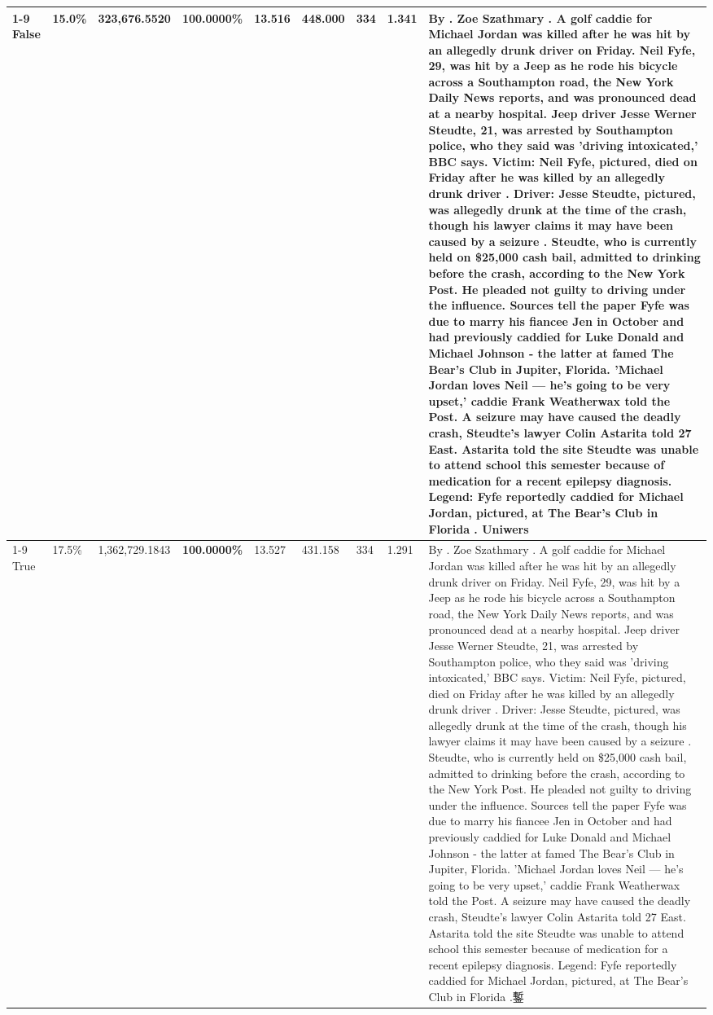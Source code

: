 \begin{table}[H]
\begin{tabular}{lllrlllll}
\cline{1-9}
False & 15.0\% & 323,676.5520 & \bfseries \color{red} 100.0000\% & 13.516 & 448.000 & 334 & 1.341 & By . Zoe Szathmary . A golf caddie for Michael Jordan was killed after he was hit by an allegedly drunk driver on Friday. Neil Fyfe, 29, was hit by a Jeep as he rode his bicycle across a Southampton road, the New York Daily News reports, and was pronounced dead at a nearby hospital. Jeep driver Jesse Werner Steudte, 21, was arrested by Southampton police, who they said was 'driving intoxicated,' BBC says. Victim: Neil Fyfe, pictured, died on Friday after he was killed by an allegedly drunk driver . Driver: Jesse Steudte, pictured, was allegedly drunk at the time of the crash, though his lawyer claims it may have been caused by a seizure . Steudte, who is currently held on \$25,000 cash bail, admitted to drinking before the crash, according to the New York Post. He pleaded not guilty to driving under the influence. Sources tell the paper Fyfe was due to marry his fiancee Jen in October and had previously caddied for Luke Donald and Michael Johnson - the latter at famed The Bear's Club in Jupiter, Florida. 'Michael Jordan loves Neil — he’s going to be very upset,' caddie Frank Weatherwax told the Post. A seizure may have caused the deadly crash, Steudte's lawyer Colin Astarita told 27 East. Astarita told the site Steudte was unable to attend school this semester because of medication for a recent epilepsy diagnosis. Legend: Fyfe reportedly caddied for Michael Jordan, pictured, at The Bear's Club in Florida . Uniwers \\
\cline{1-9}
True & 17.5\% & 1,362,729.1843 & \bfseries \color{red} 100.0000\% & 13.527 & 431.158 & 334 & 1.291 & By . Zoe Szathmary . A golf caddie for Michael Jordan was killed after he was hit by an allegedly drunk driver on Friday. Neil Fyfe, 29, was hit by a Jeep as he rode his bicycle across a Southampton road, the New York Daily News reports, and was pronounced dead at a nearby hospital. Jeep driver Jesse Werner Steudte, 21, was arrested by Southampton police, who they said was 'driving intoxicated,' BBC says. Victim: Neil Fyfe, pictured, died on Friday after he was killed by an allegedly drunk driver . Driver: Jesse Steudte, pictured, was allegedly drunk at the time of the crash, though his lawyer claims it may have been caused by a seizure . Steudte, who is currently held on \$25,000 cash bail, admitted to drinking before the crash, according to the New York Post. He pleaded not guilty to driving under the influence. Sources tell the paper Fyfe was due to marry his fiancee Jen in October and had previously caddied for Luke Donald and Michael Johnson - the latter at famed The Bear's Club in Jupiter, Florida. 'Michael Jordan loves Neil — he’s going to be very upset,' caddie Frank Weatherwax told the Post. A seizure may have caused the deadly crash, Steudte's lawyer Colin Astarita told 27 East. Astarita told the site Steudte was unable to attend school this semester because of medication for a recent epilepsy diagnosis. Legend: Fyfe reportedly caddied for Michael Jordan, pictured, at The Bear's Club in Florida .鏨 \\

\end{tabular}
\end{table}
